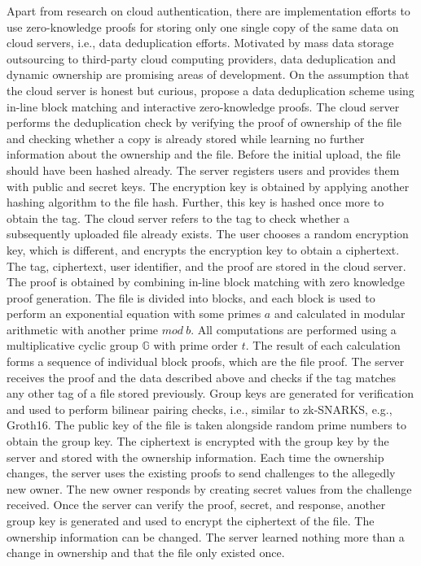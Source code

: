Apart from research on cloud authentication, there are implementation efforts to use zero-knowledge proofs for storing only one single copy of the same data on cloud servers, i.e., data deduplication efforts. Motivated by mass data storage outsourcing to third-party cloud computing providers, data deduplication and dynamic ownership are promising areas of development. On the assumption that the cloud server is honest but curious, \citet{Kanagamani} propose a data deduplication scheme using in-line block matching and interactive zero-knowledge proofs. The cloud server performs the deduplication check by verifying the proof of ownership of the file and checking whether a copy is already stored while learning no further information about the ownership and the file. Before the initial upload, the file should have been hashed already. The server registers users and provides them with public and secret keys. The encryption key is obtained by applying another hashing algorithm to the file hash.
Further, this key is hashed once more to obtain the tag. The cloud server refers to the tag to check whether a subsequently uploaded file already exists. The user chooses a random encryption key, which is different, and encrypts the encryption key to obtain a ciphertext. The tag, ciphertext, user identifier, and the proof are stored in the cloud server. The proof is obtained by combining in-line block matching with zero knowledge proof generation. The file is divided into blocks, and each block is used to perform an exponential equation with some primes \(a\) and calculated in modular arithmetic with another prime \(mod \ b\). All computations are performed using a multiplicative cyclic group \begin{math} \mathbb{G} \end{math} with prime order \(t\). The result of each calculation forms a sequence of individual block proofs, which are the file proof. The server receives the proof and the data described above and checks if the tag matches any other tag of a file stored previously. Group keys are generated for verification and used to perform bilinear pairing checks, i.e., similar to zk-SNARKS, e.g., Groth16. The public key of the file is taken alongside random prime numbers to obtain the group key. The ciphertext is encrypted with the group key by the server and stored with the ownership information. Each time the ownership changes, the server uses the existing proofs to send challenges to the allegedly new owner. The new owner responds by creating secret values from the challenge received. Once the server can verify the proof, secret, and response, another group key is generated and used to encrypt the ciphertext of the file. The ownership information can be changed. The server learned nothing more than a change in ownership and that the file only existed once. 

